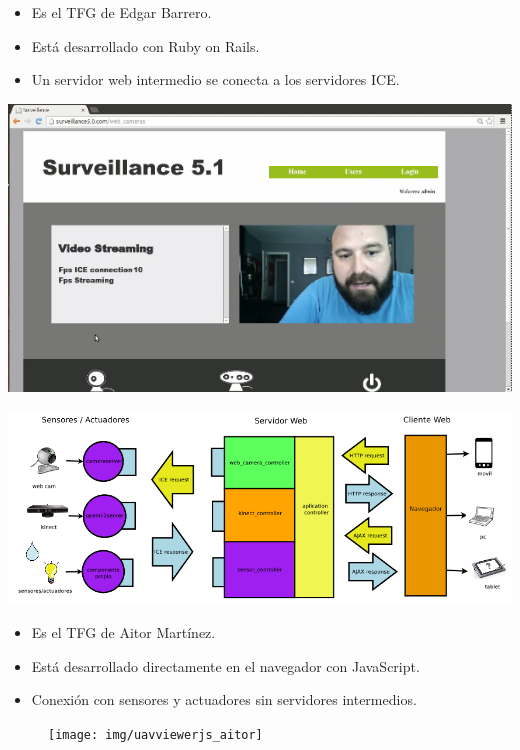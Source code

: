 \documentclass[notes,slidesec,a4]{seminar}
\begin{document}


\begin{hslide}
\begin{itemize}
\item Es el TFG de Edgar Barrero.
\item Está desarrollado con Ruby on Rails.
\item Un servidor web intermedio se conecta a los servidores ICE.
\end{itemize}
\begin{minipage}[t]{0.3\textwidth}
\includegraphics[width=\textwidth]{img/surveillance5}
\end{minipage}
\begin{minipage}[t]{0.7\textwidth}
\includegraphics[width=\textwidth]{img/esquema_s5}
\end{minipage}
\end{hslide}




\begin{hslide}
\begin{itemize}
\item Es el TFG de Aitor Martínez.
\item Está desarrollado directamente en el navegador con JavaScript.
\item Conexión con sensores y actuadores sin servidores intermedios.
\end{itemize}
\begin{center}
\begin{figure}
\texttt{[image: img/uavviewerjs\_aitor]}
\end{figure}
\end{center}
\end{hslide}
\end{document}
